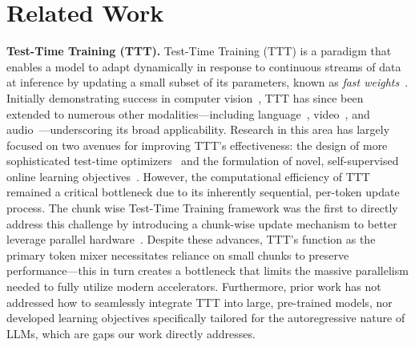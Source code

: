\section{Related Work}
\label{app:related_work}

\textbf{Test-Time Training (TTT).}
Test-Time Training (TTT) is a paradigm that enables a model to adapt dynamically in response to continuous streams of data at inference by updating a small subset of its parameters, known as \textit{fast weights}~\citep{ba2016fastweights}. Initially demonstrating success in computer vision~\citep{sun2020ttt,wang2021tent}, TTT has since been extended to numerous other modalities—including language~\citep{sun2024tttLayers}, video~\citep{dalal2025one}, and audio~\citep{dumpala2023testtimetrainingspeech}—underscoring its broad applicability. Research in this area has largely focused on two avenues for improving TTT's effectiveness: the design of more sophisticated test-time optimizers~\citep{behrouz2025itsconnectedjourneytesttime} and the formulation of novel, self-supervised online learning objectives~\citep{behrouz2024titans,karami2025lattice}. However, the computational efficiency of TTT remained a critical bottleneck due to its inherently sequential, per-token update process. The chunk wise Test-Time Training framework was the first to directly address this challenge by introducing a chunk-wise update mechanism to better leverage parallel hardware~\citep{behrouz2024titans,irie2025fastweightprogramminglinear,zhang2025tttdr,sun2023retentive,yau2025sequentialparalleldualityprefixscannable,li2025tnt}. Despite these advances, TTT's function as the primary token mixer necessitates reliance on small chunks to preserve performance—this in turn creates a bottleneck that limits the massive parallelism needed to fully utilize modern accelerators. Furthermore, prior work has not addressed how to seamlessly integrate TTT into large, pre-trained models, nor developed learning objectives specifically tailored for the autoregressive nature of LLMs, which are gaps our work directly addresses.

